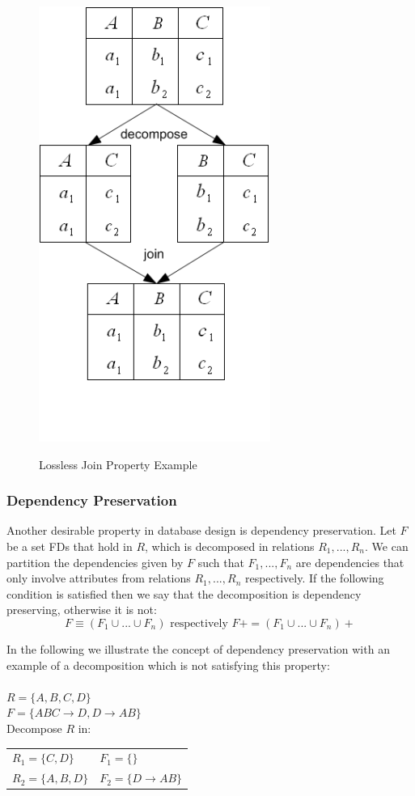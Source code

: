 \begin{figure}[h]
{    \includegraphics[scale=0.5]{./img/lossless01.png}
    \label{fig:lossless}
  }
\caption{Lossless Join Property Example}
\end{figure}

\subsubsection{Dependency Preservation}
Another desirable property in database design is dependency preservation. 
Let $F$ be a set FDs that hold in $R$, which is decomposed in relations $R_1 ,..., R_n$.
We can partition the dependencies given by $F$ such that $F_1 ,..., F_n$
are dependencies that only involve attributes from relations $R_1 ,..., R_n$ respectively. 
If the following condition is satisfied then we say that the decomposition is 
dependency preserving, otherwise it is not: 
\begin{displaymath}
F \equiv (F_1 \cup ... \cup F_n ) \mbox{  respectively  } F+ = (F_1 \cup ... \cup F_n ) +
\end{displaymath}

In the following we illustrate the concept of dependency preservation with an example
of a decomposition which is not satisfying this property: \\ \\
\indent $R = \{A, B, C, D\}$ \\
\indent $F = \{ABC \rightarrow D, D \rightarrow AB\}$ \\
\indent Decompose $R$ in: \\
\indent \begin{tabular}[h]{l l}
  $R_1 = \{C, D\}$  & $F_1 = \{ \}$ \\
  $R_2 = \{A,B,D\}$ & $F_2 = \{D \rightarrow AB \}$ \\
\end{tabular} \\

